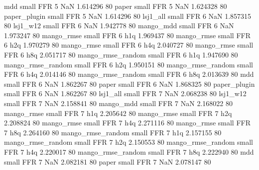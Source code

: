               mdd      small      FFR                 5                  NaN 1.614296 80
            paper      small      FFR                 5                  NaN 1.624328 80
     paper_plugin      small      FFR                 5                  NaN 1.614296 80
         lsj1_all      small      FFR                 6                  NaN 1.857315 80
         lsj1_w12      small      FFR                 6                  NaN 1.942778 80
        mango_mdd      small      FFR                 6                  NaN 1.973247 80
       mango_rmse      small      FFR                 6                  h1q 1.969437 80
       mango_rmse      small      FFR                 6                  h2q 1.970279 80
       mango_rmse      small      FFR                 6                  h4q 2.040727 80
       mango_rmse      small      FFR                 6                  h8q 2.051717 80
mango_rmse_random      small      FFR                 6                  h1q 1.947690 80
mango_rmse_random      small      FFR                 6                  h2q 1.950151 80
mango_rmse_random      small      FFR                 6                  h4q 2.014146 80
mango_rmse_random      small      FFR                 6                  h8q 2.013639 80
              mdd      small      FFR                 6                  NaN 1.862267 80
            paper      small      FFR                 6                  NaN 1.868325 80
     paper_plugin      small      FFR                 6                  NaN 1.862267 80
         lsj1_all      small      FFR                 7                  NaN 2.068238 80
         lsj1_w12      small      FFR                 7                  NaN 2.158841 80
        mango_mdd      small      FFR                 7                  NaN 2.168022 80
       mango_rmse      small      FFR                 7                  h1q 2.205642 80
       mango_rmse      small      FFR                 7                  h2q 2.208824 80
       mango_rmse      small      FFR                 7                  h4q 2.271116 80
       mango_rmse      small      FFR                 7                  h8q 2.264160 80
mango_rmse_random      small      FFR                 7                  h1q 2.157155 80
mango_rmse_random      small      FFR                 7                  h2q 2.150553 80
mango_rmse_random      small      FFR                 7                  h4q 2.220017 80
mango_rmse_random      small      FFR                 7                  h8q 2.222940 80
              mdd      small      FFR                 7                  NaN 2.082181 80
            paper      small      FFR                 7                  NaN 2.078147 80
